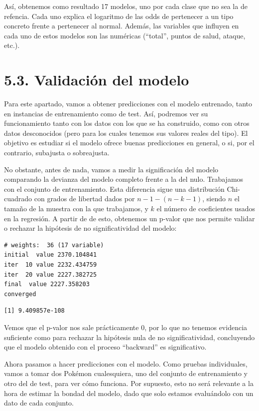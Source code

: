 \documentclass[
  12pt,
]{extreport}
\begin{document}
Así, obtenemos como resultado 17 modelos, uno por cada clase que no sea
la de refencia. Cada uno explica el logaritmo de las odds de pertenecer
a un tipo concreto frente a pertenecer al normal. Además, las variables
que influyen en cada uno de estos modelos son las numéricas (``total'',
puntos de salud, ataque, etc.).

\section{5.3. Validación del modelo}\label{validaciuxf3n-del-modelo}

Para este apartado, vamos a obtener predicciones con el modelo
entrenado, tanto en instancias de entrenamiento como de test. Así,
podremos ver su funcionamiento tanto con los datos con los que se ha
construido, como con otros datos desconocidos (pero para los cuales
tenemos sus valores reales del tipo). El objetivo es estudiar si el
modelo ofrece buenas predicciones en general, o si, por el contrario,
subajusta o sobreajusta.

No obstante, antes de nada, vamos a medir la significación del modelo
comparando la devianza del modelo completo frente a la del nulo.
Trabajamos con el conjunto de entrenamiento. Esta diferencia sigue una
distribución Chi-cuadrado con grados de libertad dados por
\(n-1 - (n-k-1)\), siendo \(n\) el tamaño de la muestra con la que
trabajamos, y \(k\) el número de coeficientes usados en la regresión. A
partir de de esto, obtenemos un p-valor que nos permite validar o
rechazar la hipótesis de no significatividad del modelo:

\begin{verbatim}
# weights:  36 (17 variable)
initial  value 2370.104841 
iter  10 value 2232.434759
iter  20 value 2227.382725
final  value 2227.358203 
converged
\end{verbatim}

\begin{verbatim}
[1] 9.409857e-108
\end{verbatim}

Vemos que el p-valor nos sale prácticamente 0, por lo que no tenemos
evidencia suficiente como para rechazar la hipótesis nula de no
significatividad, concluyendo que el modelo obtenido con el proceso
``backward'' es significativo.

Ahora pasamos a hacer predicciones con el modelo. Como pruebas
individuales, vamos a tomar dos Pokémon cualesquiera, uno del conjunto
de entrenamiento y otro del de test, para ver cómo funciona. Por
supuesto, esto no será relevante a la hora de estimar la bondad del
modelo, dado que solo estamos evaluándolo con un dato de cada conjunto.
\end{document}
